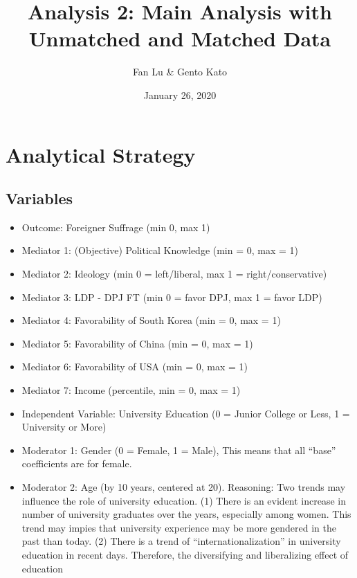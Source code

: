 \documentclass[
]{article}
\title{Analysis 2: Main Analysis with Unmatched and Matched Data}
\author{Fan Lu \& Gento Kato}
\date{January 26, 2020}
\begin{document}
\maketitle

\hypertarget{analytical-strategy}{%
\section{Analytical Strategy}\label{analytical-strategy}}

\hypertarget{variables}{%
\subsection{Variables}\label{variables}}

\begin{itemize}
\item
  Outcome: Foreigner Suffrage (min 0, max 1)
\item
  Mediator 1: (Objective) Political Knowledge (min = 0, max = 1)
\item
  Mediator 2: Ideology (min 0 = left/liberal, max 1 =
  right/conservative)
\item
  Mediator 3: LDP - DPJ FT (min 0 = favor DPJ, max 1 = favor LDP)
\item
  Mediator 4: Favorability of South Korea (min = 0, max = 1)\\
\item
  Mediator 5: Favorability of China (min = 0, max = 1)\\
\item
  Mediator 6: Favorability of USA (min = 0, max = 1)\\
\item
  Mediator 7: Income (percentile, min = 0, max = 1)
\item
  Independent Variable: University Education (0 = Junior College or
  Less, 1 = University or More)
\item
  Moderator 1: Gender (0 = Female, 1 = Male), This means that all
  ``base'' coefficients are for female.
\item
  Moderator 2: Age (by 10 years, centered at 20). Reasoning: Two trends
  may influence the role of university education. (1) There is an
  evident increase in number of university graduates over the years,
  especially among women. This trend may impies that university
  experience may be more gendered in the past than today. (2) There is a
  trend of ``internationalization'' in university education in recent
  days. Therefore, the diversifying and liberalizing effect of education

\end{itemize}
\end{document}
